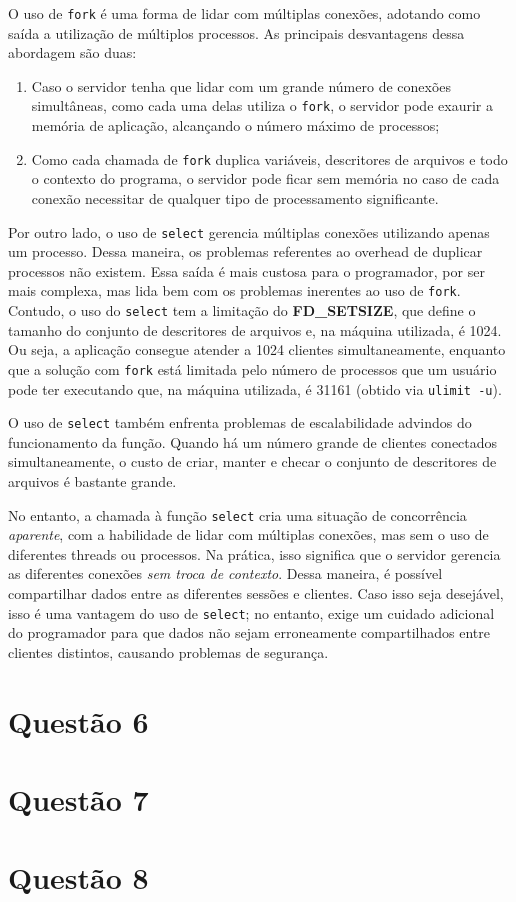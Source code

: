 \documentclass[a4paper,10pt]{article}
\begin{document}
O uso de {\tt fork} é uma forma de lidar com múltiplas conexões, adotando como saída a utilização de múltiplos processos. As principais desvantagens dessa abordagem são duas:
\begin{enumerate}
\item Caso o servidor tenha que lidar com um grande número de conexões simultâneas, como cada uma delas utiliza o {\tt fork}, o servidor pode exaurir a memória de aplicação, alcançando o número máximo de processos;
\item Como cada chamada de {\tt fork} duplica variáveis, descritores de arquivos e todo o contexto do programa, o servidor pode ficar sem memória no caso de cada conexão necessitar de qualquer tipo de processamento significante.
\end{enumerate}

Por outro lado, o uso de {\tt select} gerencia múltiplas conexões utilizando apenas um processo. Dessa maneira, os problemas referentes ao overhead de duplicar processos não existem. Essa saída é mais custosa para o programador, por ser mais complexa, mas lida bem com os problemas inerentes ao uso de {\tt fork}. Contudo, o uso do {\tt select} tem a limitação do \textbf{FD\_SETSIZE}, que define o tamanho do conjunto de descritores de arquivos e, na máquina utilizada, é 1024. Ou seja, a aplicação consegue atender a 1024 clientes simultaneamente, enquanto que a solução com {\tt fork} está limitada pelo número de processos que um usuário pode ter executando que, na máquina utilizada, é 31161 (obtido via {\tt ulimit -u}).

O uso de {\tt select} também enfrenta problemas de escalabilidade advindos do funcionamento da função. Quando há um número grande de clientes conectados simultaneamente, o custo de criar, manter e checar o conjunto de descritores de arquivos é bastante grande. 

No entanto, a chamada à função {\tt select} cria uma situação de concorrência \textit{aparente}, com a habilidade de lidar com múltiplas conexões, mas sem o uso de diferentes threads ou processos. Na prática, isso significa que o servidor gerencia as diferentes conexões \textit{sem troca de contexto}. Dessa maneira, é possível compartilhar dados entre as diferentes sessões e clientes. Caso isso seja desejável, isso é uma vantagem do uso de {\tt select}; no entanto, exige um cuidado adicional do programador para que dados não sejam erroneamente compartilhados entre clientes distintos, causando problemas de segurança.

\section{Questão 6}


\section{Questão 7}


\section{Questão 8}
\end{document}
